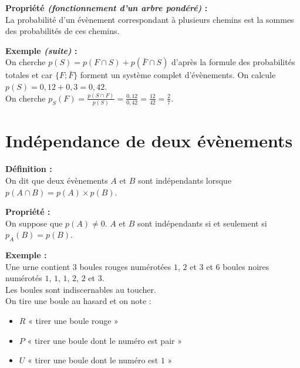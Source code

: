 \documentclass{article}
\begin{document}
\begin{mdframed}[style=proprieteStyle]
  \textbf{Propriété \emph{(fonctionnement d'un arbre pondéré)} :} ~\\
  La probabilité d'un évènement correspondant à plusieurs chemins est la sommes des probabilités de ces chemins.
\end{mdframed}

\textbf{Exemple \emph{(suite)} :} ~\\
On cherche $p(S)=p(F\cap S)+p(\bar F\cap S)$ d'après la formule des probabilités totales et car $\{ F; \bar F \}$ forment un système complet d'évènements. On calcule $p(S)=0,12+0,3=0,42$.\\

On cherche $\displaystyle{}p_S(F)=\frac{p(S\cap F)}{p(S)}=\frac{0,12}{0,42}=\frac{12}{42}=\frac{2}{7}.$

\section{Indépendance de deux évènements}

\begin{mdframed}[style=definitionStyle]
  \textbf{Définition :} ~\\
  On dit que deux évènements $A$ et $B$ sont indépendants lorsque $p(A\cap B)=p(A)\times p(B)$.
\end{mdframed}

\begin{mdframed}[style=proprieteStyle]
  \textbf{Propriété :} ~\\
  On suppose que $p(A)\not=0$. $A$ et $B$ sont indépendants si et seulement si $p_A(B)=p(B)$.
\end{mdframed}

\textbf{Exemple :} ~\\
Une urne contient $3$ boules rouges numérotées $1$, $2$ et $3$ et $6$ boules noires numérotés $1$, $1$, $1$, $2$, $2$ et $3$. \\
Les boules sont indiscernables au toucher. \\

On tire une boule au hasard et on note :
\vspace{-6pt}
\begin{itemize}
  \item $R$ « tirer une boule rouge »
  \item $P$ « tirer une boule dont le numéro est pair »
  \item $U$ « tirer une boule dont le numéro est $1$ »
\end{itemize}
\end{document}
